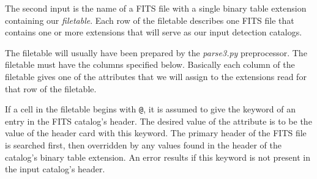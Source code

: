 \documentclass[11pt,preprint,flushrt]{aastex}
\begin{document}
The second input is the name of a FITS file with a single binary table extension containing our {\em filetable}.  Each row of the filetable describes one FITS file that contains one or more extensions that will serve as our input detection catalogs.  

The filetable will usually have been prepared by the {\em parse3.py} preprocessor. The filetable must have the columns specified below.  Basically each column of the filetable gives one of the attributes that we will assign to the extensions read for that row of the filetable.  

If a cell in the filetable begins with {\tt @}, it is assumed to give the keyword of an entry in the FITS catalog's header.  The desired value of the attribute is to be the value of the header card with this keyword.  The primary header of the FITS file is searched first, then overridden by any values found in the header of the catalog's binary table extension. An error results if this keyword is not present in the input catalog's header.
\end{document}
